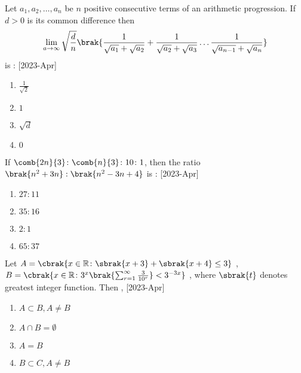     \item Let $a_1 , a_2 , \dots , a_n$ be $n$ positive consecutive terms of an arithmetic progression. If $d > 0$ is its common difference then 
    \begin{align}
    \lim\limits_{a \rightarrow \infty} \sqrt{\frac{d}{n}}\brak{\frac{1}{\sqrt{a_1}+\sqrt{a_2}} + \frac{1}{\sqrt{a_2}+\sqrt{a_3}} \dots \frac{1}{\sqrt{a_{n-1}}+\sqrt{a_n}}}
    \end{align}
    is :  \hfill[2023-Apr]
    \begin{multicols}{2}
    \begin{enumerate}
        \item $\frac{1}{\sqrt{2}}$
        \item $1$\\
        \item $\sqrt{d}$
        \item $0$
    \end{enumerate}
    \end{multicols}
     \item If $\comb{2n}{3} \colon \comb{n}{3} \colon 10 \colon 1$, then the ratio $\brak{n^2 + 3n} : \brak{n^2 - 3n +4}$ is : \hfill[2023-Apr]
    \begin{multicols}{2}
    \begin{enumerate}
        \item $27 \colon 11$
        \item $35 \colon 16$\\
        \item $2 \colon 1$
        \item $65 \colon 37$
    \end{enumerate}
    \end{multicols}
    \item Let $A = \cbrak{ x \in \mathbb{R} \colon \sbrak{x+3} + \sbrak{x+4} \leq 3}$ , $ B = \cbrak{ x \in \mathbb{R} \colon 3^x \brak{\sum_{r=1}^\infty\frac{3}{10^r} }< 3 ^{-3x}}$ , where $\sbrak{t}$ denotes greatest integer function. Then , \hfill[2023-Apr]
    \begin{multicols}{2}
    \begin{enumerate}
        \item $ A \subset B , A \neq B $
        \item $ A \cap B = \emptyset$
        \item $A = B$
        \item $B \subset C , A \neq B$
    \end{enumerate}
    \end{multicols}

